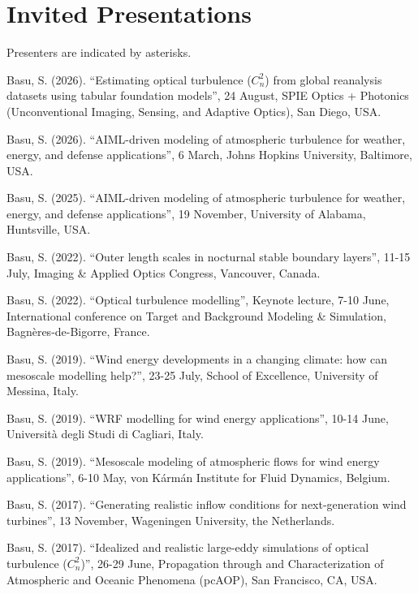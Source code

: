 \section*{Invited Presentations}
Presenters are indicated by asterisks.\\ 

\normalsize

\begin{etaremune}[topsep=0pt,itemsep=0pt,partopsep=0pt,parsep=0pt]
    \item Basu, S. (2026). ``Estimating optical turbulence ($C_n^2$) from global reanalysis datasets using tabular foundation models'', 24 August, SPIE Optics + Photonics (Unconventional Imaging, Sensing, and Adaptive Optics), San Diego, USA.
    \item Basu, S. (2026). ``AIML-driven modeling of atmospheric turbulence for weather, energy, and defense applications'', 6 March, Johns Hopkins University, Baltimore, USA.
    \item Basu, S. (2025). ``AIML-driven modeling of atmospheric turbulence for weather, energy, and defense applications'', 19 November, University of Alabama, Huntsville, USA.
    \item Basu, S. (2022). ``Outer length scales in nocturnal stable boundary layers'', 11-15 July, Imaging \& Applied Optics Congress, Vancouver, Canada.
    \item Basu, S. (2022). ``Optical turbulence modelling'', Keynote lecture, 7-10 June, International conference on Target and Background Modeling \& Simulation, Bagnères-de-Bigorre, France.
    \item Basu, S. (2019). ``Wind energy developments in a changing climate: how can mesoscale modelling help?'', 23-25 July, School of Excellence, University of Messina, Italy.  
    \item Basu, S. (2019). ``WRF modelling for wind energy applications'', 10-14 June, Università degli Studi di Cagliari, Italy. 
    \item Basu, S. (2019). ``Mesoscale modeling of atmospheric flows for wind energy applications'', 6-10 May, von Kármán Institute for Fluid Dynamics, Belgium.
    \item Basu, S. (2017). ``Generating realistic inflow conditions for next-generation wind turbines'', 13 November, Wageningen University, the Netherlands. 
    \item Basu, S. (2017). ``Idealized and realistic large-eddy simulations of optical turbulence ($C_n^2$)'', 26-29 June, Propagation through and Characterization of Atmospheric and Oceanic Phenomena (pcAOP), San Francisco, CA, USA.

\end{etaremune}
